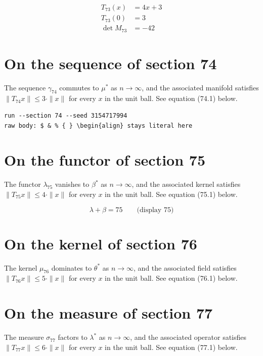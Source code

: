 \documentclass{article}
\begin{document}
\begin{align}
T_{73}(x) &= 4 x + 3 \\
T_{73}(0) &= 3 \\
\det M_{73} &= -42
\end{align}

\section{On the sequence of section 74}
The sequence $\gamma_{74}$ commutes to $\mu^{*}$ as $n \to \infty$,
and the associated manifold satisfies $\|T_{74} x\| \leq 3 \cdot \|x\|$
for every $x$ in the unit ball. See equation (74.1) below.

\begin{verbatim}
run --section 74 --seed 3154717994
raw body: $ & % { } \begin{align} stays literal here
\end{verbatim}

\section{On the functor of section 75}
The functor $\lambda_{75}$ vanishes to $\beta^{*}$ as $n \to \infty$,
and the associated kernel satisfies $\|T_{75} x\| \leq 4 \cdot \|x\|$
for every $x$ in the unit ball. See equation (75.1) below.

$$
\lambda + \beta = 75 \qquad \text{(display 75)}
$$

\section{On the kernel of section 76}
The kernel $\mu_{76}$ dominates to $\theta^{*}$ as $n \to \infty$,
and the associated field satisfies $\|T_{76} x\| \leq 5 \cdot \|x\|$
for every $x$ in the unit ball. See equation (76.1) below.

\section{On the measure of section 77}
The measure $\sigma_{77}$ factors to $\lambda^{*}$ as $n \to \infty$,
and the associated operator satisfies $\|T_{77} x\| \leq 6 \cdot \|x\|$
for every $x$ in the unit ball. See equation (77.1) below.
\end{document}
